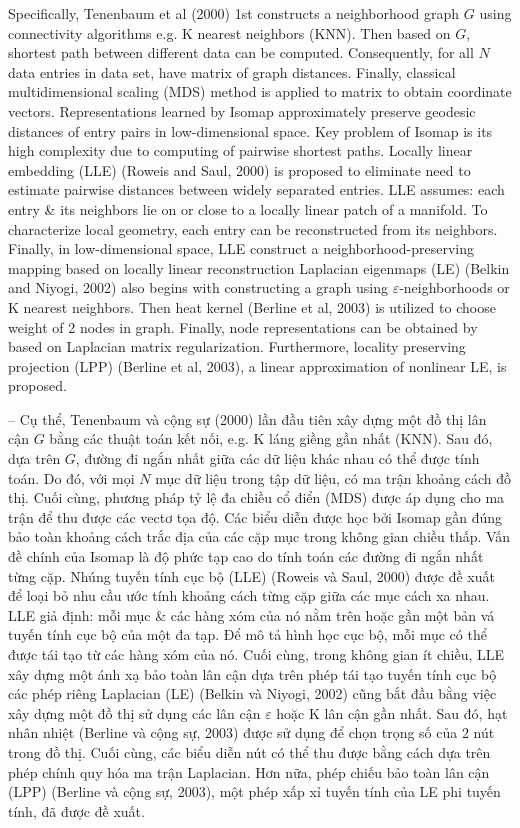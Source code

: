 \documentclass{article}
\begin{document}
\begin{itemize}
\begin{itemize}
        Specifically, Tenenbaum et al (2000) 1st constructs a neighborhood graph $G$ using connectivity algorithms e.g. K nearest neighbors (KNN). Then based on $G$, shortest path between different data can be computed. Consequently, for all $N$ data entries in data set, have matrix of graph distances. Finally, classical multidimensional scaling (MDS) method is applied to matrix to obtain coordinate vectors. Representations learned by Isomap approximately preserve geodesic distances of entry pairs in low-dimensional space. Key problem of Isomap is its high complexity due to computing of pairwise shortest paths. Locally linear embedding (LLE) (Roweis and Saul, 2000) is proposed to eliminate need to estimate pairwise distances between widely separated entries. LLE assumes: each entry \& its neighbors lie on or close to a locally linear patch of a manifold. To characterize local geometry, each entry can be reconstructed from its neighbors. Finally, in low-dimensional space, LLE construct a neighborhood-preserving mapping based on locally linear reconstruction Laplacian eigenmaps (LE) (Belkin and Niyogi, 2002) also begins with constructing a graph using $\varepsilon$-neighborhoods or K nearest neighbors. Then heat kernel (Berline et al, 2003) is utilized to choose weight of 2 nodes in graph. Finally, node representations can be obtained by based on Laplacian matrix regularization. Furthermore, locality preserving projection (LPP) (Berline et al, 2003), a linear approximation of nonlinear LE, is proposed.

        -- Cụ thể, Tenenbaum và cộng sự (2000) lần đầu tiên xây dựng một đồ thị lân cận $G$ bằng các thuật toán kết nối, e.g. K láng giềng gần nhất (KNN). Sau đó, dựa trên $G$, đường đi ngắn nhất giữa các dữ liệu khác nhau có thể được tính toán. Do đó, với mọi $N$ mục dữ liệu trong tập dữ liệu, có ma trận khoảng cách đồ thị. Cuối cùng, phương pháp tỷ lệ đa chiều cổ điển (MDS) được áp dụng cho ma trận để thu được các vectơ tọa độ. Các biểu diễn được học bởi Isomap gần đúng bảo toàn khoảng cách trắc địa của các cặp mục trong không gian chiều thấp. Vấn đề chính của Isomap là độ phức tạp cao do tính toán các đường đi ngắn nhất từng cặp. Nhúng tuyến tính cục bộ (LLE) (Roweis và Saul, 2000) được đề xuất để loại bỏ nhu cầu ước tính khoảng cách từng cặp giữa các mục cách xa nhau. LLE giả định: mỗi mục \& các hàng xóm của nó nằm trên hoặc gần một bản vá tuyến tính cục bộ của một đa tạp. Để mô tả hình học cục bộ, mỗi mục có thể được tái tạo từ các hàng xóm của nó. Cuối cùng, trong không gian ít chiều, LLE xây dựng một ánh xạ bảo toàn lân cận dựa trên phép tái tạo tuyến tính cục bộ các phép riêng Laplacian (LE) (Belkin và Niyogi, 2002) cũng bắt đầu bằng việc xây dựng một đồ thị sử dụng các lân cận $\varepsilon$ hoặc K lân cận gần nhất. Sau đó, hạt nhân nhiệt (Berline và cộng sự, 2003) được sử dụng để chọn trọng số của 2 nút trong đồ thị. Cuối cùng, các biểu diễn nút có thể thu được bằng cách dựa trên phép chính quy hóa ma trận Laplacian. Hơn nữa, phép chiếu bảo toàn lân cận (LPP) (Berline và cộng sự, 2003), một phép xấp xỉ tuyến tính của LE phi tuyến tính, đã được đề xuất.


\end{itemize}
\end{itemize}
\end{document}
